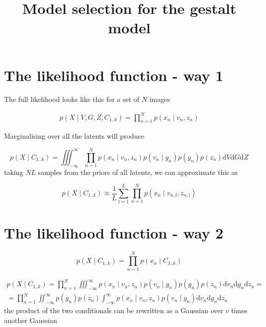 \documentclass{paper}
\begin{document}
\title{Model selection for the gestalt model}
\maketitle

\section{The likelihood function - way 1}

The full likelihood looks like this for a set of $N$ images

\begin{equation}
\begin{split}
p(X \mid V,G,Z,C_{1..k}) = \prod_{n=1}^N p(x_n \mid v_n,z_n)
\end{split}
\end{equation}


Marginalising over all the latents will produce

\begin{equation}
p(X \mid C_{1..k}) = \iiint_{-\infty}^{\infty} \prod_{n=1}^N p(x_n \mid v_n,z_n) p(v_n \mid g_n) p(g_n) p(z_n) \mathrm{d}V\mathrm{d}G\mathrm{d}Z
\end{equation}
%
taking $NL$ samples from the priors of all latents, we can approximate this as

\begin{equation}
p(X \mid C_{1..k}) \approx \frac{1}{L} \sum_{l = 1}^{L} \prod_{n=1}^N p(x_n \mid v_{n,l},z_{n,l}) 
\end{equation}

\section{The likelihood function - way 2}

\begin{equation}
p(X \mid C_{1..k}) = \prod_{n=1}^N p(x_n \mid C_{1..k}) 
\end{equation}

\begin{equation}
\begin{split}
p(X \mid C_{1..k}) = \prod_{n=1}^N \iiint_{-\infty}^{\infty} p(x_n \mid v_n,z_n) p(v_n \mid g_n) p(g_n) p(z_n) \mathrm{d}v_n\mathrm{d}g_n\mathrm{d}z_n = \\
= \prod_{n=1}^N \iint_{-\infty}^{\infty}  p(g_n) p(z_n) \int_{-\infty}^{\infty} p(x_n \mid v_n,z_n) p(v_n \mid g_n) \mathrm{d}v_n\mathrm{d}g_n \mathrm{d}z_n
\end{split}
\end{equation}
%
the product of the two conditionals can be rewritten as a Gaussian over $v$ times another Gaussian
\end{document}

